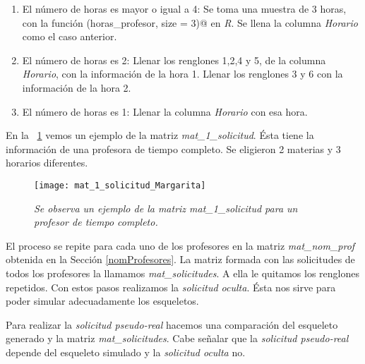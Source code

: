 \begin{enumerate}
\begin{enumerate}
\item El número de horas es mayor o igual a 4: Se toma una muestra de 3 horas, con la función \verb@sample(horas_profesor, size = 3)@ en \textit{R}. Se llena la columna \textit{Horario} como el caso anterior.

\item El número de horas es 2: Llenar los renglones 1,2,4 y 5, de la columna \textit{Horario}, con la información de la hora 1. Llenar los renglones 3 y 6 con la información de la hora 2.

\item El número de horas es 1: Llenar la columna \textit{Horario} con esa hora.
\end{enumerate}
\end{enumerate}

En la \figurename{~\ref{mat_1_solicitud_Margarita}} vemos un ejemplo de la matriz \textit{mat\_1\_solicitud}. Ésta tiene la información de una profesora de tiempo completo. Se eligieron 2 materias y 3 horarios diferentes.

\begin{figure}[H]
\centering
\texttt{[image: mat\_1\_solicitud\_Margarita]} %
\caption[\textit{Matriz de solicitudes de un profesor}]{\textit{Se observa un ejemplo de la matriz mat\_1\_solicitud para un profesor de tiempo completo.}}\label{mat_1_solicitud_Margarita}
\end{figure}

El proceso se repite para cada uno de los profesores en la matriz \textit{mat\_nom\_prof} obtenida en la Sección \ref{nomProfesores}. La matriz formada con las solicitudes de todos los profesores la llamamos \textit{mat\_solicitudes}. A ella le quitamos los renglones repetidos. Con estos pasos realizamos la \textit{solicitud oculta}. Ésta nos sirve para poder simular adecuadamente los esqueletos.

Para realizar la \textit{solicitud pseudo-real} hacemos una comparación del esqueleto generado y la matriz \textit{mat\_solicitudes}. Cabe señalar que la \textit{solicitud pseudo-real} depende del esqueleto simulado y la \textit{solicitud oculta} no.
